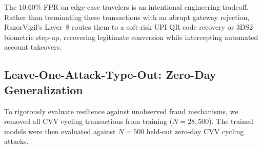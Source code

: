 \documentclass[conference]{IEEEtran}
\begin{document}
\begin{table}[h]
\caption{Per-Segment Operating Rates ($N=10{,}000$ Test Partition)}
\setlength{\tabcolsep}{3pt}
\footnotesize
\label{tab:segments}
\centering\small
{}
\end{table}

The $10.60\%$ FPR on edge-case travelers is an intentional engineering tradeoff. Rather than terminating these transactions with an abrupt gateway rejection, RazorVigil's Layer~8 routes them to a soft-risk UPI QR code recovery or 3DS2 biometric step-up, recovering legitimate conversion while intercepting automated account takeovers.

\subsection{Leave-One-Attack-Type-Out: Zero-Day Generalization}
\label{sec:zeroday}
To rigorously evaluate resilience against unobserved fraud mechanisms, we removed all CVV cycling transactions from training ($N=28{,}500$). The trained models were then evaluated against $N=500$ held-out zero-day CVV cycling attacks.
\end{document}
